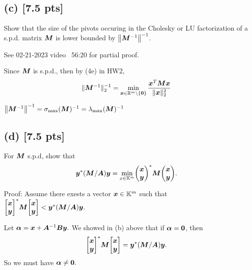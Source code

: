 \documentclass[twoside,10pt]{article}
\begin{document}
\subsection*{(c) [7.5 pts]} 
Show that the size of the pivots occuring in the Cholesky or LU factorization of a s.p.d. matrix $\bm{M}$ is lower bounded by $\left\|\mtx{M}^{-1}\right\|^{-1}$.

See 02-21-2023 video ~56:20 for partial proof.

Since $\bm{M}$ is s.p.d., then by (4e) in HW2,
\begin{equation*}
  \|\bm{M}^{-1}\|_{2}^{-1} = \min \limits_{\bm{x} \in \mathbb{R}^m \setminus \{\bm{0}\}} \frac{\bm{x}^T \bm{M} \bm{x}}{\|\bm{x}\|^2_2}
\end{equation*}

$\left\|\mtx{M}^{-1}\right\|^{-1} = \sigma_{\max}(\mtx{M})^{-1} = \lambda_{\max}(\mtx{M})^{-1}$

\subsection*{(d) [7.5 pts]}
For $\bm{M}$ s.p.d, show that 
\begin{equation} 
  \vct{y}^* \left(\mtx{M} / \mtx{A}\right) \vct{y} = \min \limits_{x \in \K^{m}} 
  \begin{pmatrix}
    \vct{x}\\
    \vct{y} 
  \end{pmatrix}^* 
  \mtx{M}
  \begin{pmatrix}
    \vct{x}\\
    \vct{y} 
  \end{pmatrix}.
\end{equation}

Proof: Assume there exests a vector $\bm{x} \in \mathbb{K}^{m}$ such that $\begin{bmatrix}\vct{x}\\\vct{y}\end{bmatrix}^{*}\mtx{M}\begin{bmatrix}\vct{x}\\\vct{y}\end{bmatrix} < \vct{y}^* \left(\mtx{M} / \mtx{A}\right) \vct{y}.$

Let $\bm{\alpha} = \bm{x} + \bm{A}^{-1}\bm{B}\bm{y}.$
We showed in (b) above that if $\bm{\alpha} = \bm{0}$, then
$$\begin{bmatrix}\vct{x}\\\vct{y}\end{bmatrix}^{*}\mtx{M}\begin{bmatrix}\vct{x}\\\vct{y}\end{bmatrix} = \vct{y}^{*}\left(\mtx{M} / \mtx{A}\right)\vct{y}.$$
So we must have $\bm{\alpha} \neq \bm{0}.$
\end{document}
